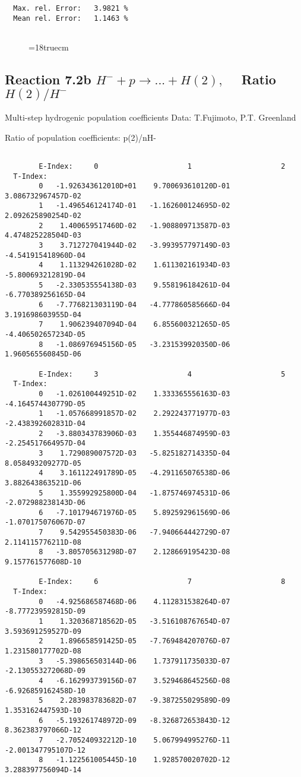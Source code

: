 \begin{verbatim}
  Max. rel. Error:   3.9821 %
  Mean rel. Error:   1.1463 %


\end{verbatim}
\begin{figure} \label{7.2a}
\epsfxsize=18truecm
\end{figure}
\newpage


\subsection{
Reaction 7.2b $ H^- + p \rightarrow ...+ H(2) , \quad $
Ratio $H(2)/H^- $
}
 Multi-step hydrogenic population coefficients
 Data: T.Fujimoto, P.T. Greenland

 Ratio of population coefficients: p(2)/nH-

\begin{verbatim}

        E-Index:     0                     1                     2
  T-Index:
        0   -1.926343612010D+01    9.700693610120D-01    3.086732967457D-02
        1   -1.496546124174D-01   -1.162600124695D-02    2.092625890254D-02
        2    1.400659517460D-02   -1.908809713587D-03    4.474825228504D-03
        3    3.712727041944D-02   -3.993957797149D-03   -4.541915418960D-04
        4    1.113294261028D-02    1.611302161934D-03   -5.800693212819D-04
        5   -2.330535554138D-03    9.558196184261D-04   -6.770389256165D-04
        6   -7.776821303119D-04   -4.777860585666D-04    3.191698603955D-04
        7    1.906239407094D-04    6.855600321265D-05   -4.406502657234D-05
        8   -1.086976945156D-05   -3.231539920350D-06    1.960565560845D-06

        E-Index:     3                     4                     5
  T-Index:
        0   -1.026100449251D-02    1.333365556163D-03   -4.164574430779D-05
        1   -1.057668991857D-02    2.292243771977D-03   -2.438392602831D-04
        2   -3.880343783906D-03    1.355446874959D-03   -2.254517664957D-04
        3    1.729089007572D-03   -5.825182714335D-04    8.058493209277D-05
        4    3.161122491789D-05   -4.291165076538D-06    3.882643863521D-06
        5    1.355992925800D-04   -1.875746974531D-06   -2.072988238143D-06
        6   -7.101794671976D-05    5.892592961569D-06   -1.070175076067D-07
        7    9.542955450383D-06   -7.940664442729D-07    2.114115776211D-08
        8   -3.805705631298D-07    2.128669195423D-08    9.157761577608D-10

        E-Index:     6                     7                     8
  T-Index:
        0   -4.925686587468D-06    4.112831538264D-07   -8.777239592815D-09
        1    1.320368718562D-05   -3.516108767654D-07    3.593691259527D-09
        2    1.896658591425D-05   -7.769484207076D-07    1.231580177702D-08
        3   -5.398656503144D-06    1.737911735033D-07   -2.130553272068D-09
        4   -6.162993739156D-07    3.529468645256D-08   -6.926859162458D-10
        5    2.283983783682D-07   -9.387255029589D-09    1.353162447593D-10
        6   -5.193261748972D-09   -8.326872653843D-12    8.362383797066D-12
        7   -2.705240932212D-10    5.067994995276D-11   -2.001347795107D-12
        8   -1.122561005445D-10    1.928570020702D-12    3.288397756094D-14


\end{verbatim}
